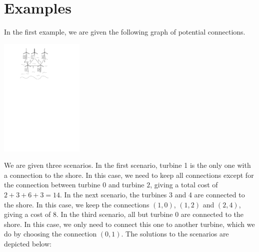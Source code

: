 \section*{Examples}
In the first example, we are given the following graph of potential connections.

\begin{center}
\includegraphics[width=0.3\textwidth]{sample1.pdf}
\end{center}
We are given three scenarios.
In the first scenario, turbine 1 is the only one with a connection to the shore. In this case, we need to keep all connections except for the connection between turbine $0$ and turbine $2$, giving a total cost of $2+3+6+3=14$.
In the next scenario, the turbines 3 and 4 are connected to the shore. In this case, we keep the connections $(1,0)$, $(1,2)$ and $(2,4)$, giving a cost of 8.
In the third scenario, all but turbine 0 are connected to the shore. In this case, we only need to connect this one to another turbine, which we do by choosing the connection $(0,1)$.
The solutions to the scenarios are depicted below:

